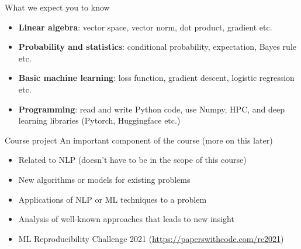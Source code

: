 \documentclass[usenames,dvipsnames,notes,11pt,aspectratio=169]{beamer}
\begin{document}
\begin{frame}
    {What we expect you to know}
    \begin{itemize}
        \itemsep1em
        \item \textbf{Linear algebra}: vector space, vector norm, dot product, gradient etc.
        \item \textbf{Probability and statistics}: conditional probability, expectation, Bayes rule etc.
        \item \textbf{Basic machine learning}: loss function, gradient descent, logistic regression etc.
        \item \textbf{Programming}: read and write Python code, use Numpy, HPC, and deep learning libraries (Pytorch, Huggingface etc.)
    \end{itemize}
\end{frame}

\begin{frame}
    {Course project}
    An important component of the course (more on this later)
    \begin{itemize}
        \itemsep1em
        \item Related to NLP (doesn't have to be in the scope of this course)
        \item New algorithms or models for existing problems
        \item Applications of NLP or ML techniques to a problem
        \item Analysis of well-known approaches that leads to new insight
        \item ML Reproducibility Challenge 2021 (\url{https://paperswithcode.com/rc2021}) 
    \end{itemize}
\end{frame}
\end{document}
